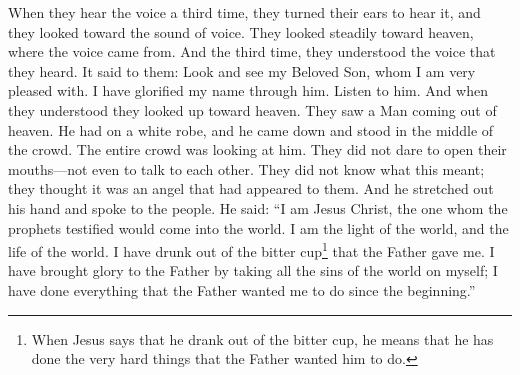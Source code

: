\bverse \iffalse And again the third time they did hear the voice, and did open their ears to hear it; and their eyes were towards the sound thereof; and they did look steadfastly towards heaven, from whence the sound came. \fi
When they hear the voice a third time, they turned their ears to hear it, and they looked toward the sound of voice. They looked steadily toward heaven, where the voice came from.
\bverse \iffalse And behold, the third time they did understand the voice which they heard; and it said unto them: \fi
And the third time, they understood the voice that they heard. It said to them:
\bverse \iffalse Behold my Beloved Son, in whom I am well pleased, in whom I have glorified my name--hear ye him. \fi
Look and see my Beloved Son, whom I am very pleased with. I have glorified my name through him. Listen to him.
\bverse \iffalse And it came to pass, as they understood they cast their eyes up again towards heaven; and behold, they saw a Man descending out of heaven; and he was clothed in a white robe; and he came down and stood in the midst of them; and the eyes of the whole multitude were turned upon him, and they durst not open their mouths, even one to another, and wist not what it meant, for they thought it was an angel that had appeared unto them. \fi
And when they understood they looked up toward heaven. They saw a Man coming out of heaven. He had on a white robe, and he came down and stood in the middle of the crowd. The entire crowd was looking at him. They did not dare to open their mouths---not even to talk to each other. They did not know what this meant; they thought it was an angel that had appeared to them.
\bverse \iffalse And it came to pass that he stretched forth his hand and spake unto the people, saying: \fi
And he stretched out his hand and spoke to the people. He said:
\bverse \iffalse Behold, I am Jesus Christ, whom the prophets testified shall come into the world. \fi
``I am Jesus Christ, the one whom the prophets testified would come into the world.
\bverse \iffalse And behold, I am the light and the life of the world; and I have drunk out of that bitter cup which the Father hath given me, and have glorified the Father in taking upon me the sins of the world, in the which I have suffered the will of the Father in all things from the beginning. \fi
I am the light of the world, and the life of the world. I have drunk out of the bitter cup\footnote{When Jesus says that he drank out of the bitter cup, he means that he has done the very hard things that the Father wanted him to do.} that the Father gave me. I have brought glory to the Father by taking all the sins of the world on myself; I have done everything that the Father wanted me to do since the beginning.''
